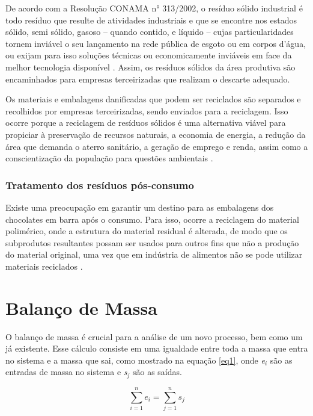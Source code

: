 \documentclass[
	12pt,				%
	openright,			%
	oneside,			%
	a4paper,			%
	english,			%
	french,				%
	spanish,			%
	brazil				%
	]{abntex2}
\begin{document}
De acordo com a Resolução CONAMA n° 313/2002, o resíduo sólido industrial é todo
resíduo que resulte de atividades industriais e que se encontre nos estados sólido, semi sólido,
gasoso – quando contido, e líquido – cujas particularidades tornem inviável o seu lançamento
na rede pública de esgoto ou em corpos d’água, ou exijam para isso soluções técnicas ou
economicamente inviáveis em face da melhor tecnologia disponível \cite{PNRS}. Assim, os
resíduos sólidos da área produtiva são encaminhados para empresas terceirizadas que realizam
o descarte adequado.

Os materiais e embalagens danificadas que podem ser reciclados são separados e
recolhidos por empresas terceirizadas, sendo enviados para a reciclagem. Isso ocorre porque a
reciclagem de resíduos sólidos é uma alternativa viável para propiciar à preservação de
recursos naturais, a economia de energia, a redução da área que demanda o aterro sanitário, a
geração de emprego e renda, assim como a conscientização da população para questões
ambientais \cite{Ole}.

\subsection{Tratamento dos resíduos pós-consumo}

Existe uma preocupação em garantir um destino para as embalagens dos chocolates
em barra após o consumo. Para isso, ocorre a reciclagem do material polimérico, onde a
estrutura do material residual é alterada, de modo que os subprodutos resultantes possam ser
usados para outros fins que não a produção do material original, uma vez que em indústria de
alimentos não se pode utilizar materiais reciclados \cite{oliveira}.





\newpage
\chapter{Balanço de Massa}

O balanço de massa é crucial para a análise de um novo processo, bem como um já existente. Esse cálculo consiste em uma igualdade entre toda a massa que entra no sistema e a massa que sai, como mostrado na equação \ref{eq1}, onde \textit{e$_{i}$} são as entradas de massa no sistema e \textit{s$_{j}$} são as saídas. 

\begin{equation}
\sum\limits_{i=1}^{n}e_{i}=\sum\limits_{j=1}^{n}s_{j}
\label{eq1}
\end{equation}
\end{document}
